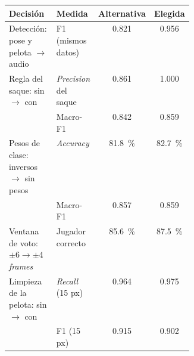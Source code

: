 \begin{tabular}{>{\raggedright\arraybackslash}p{0.36\linewidth}lcc}
\toprule
Decisión & Medida & Alternativa & Elegida \\
\midrule
Detección: pose y pelota $\to$ audio & F1 (mismos datos) & \num{0.821} & \num{0.956} \\
\midrule
Regla del saque: sin $\to$ con & \emph{Precision} del saque & \num{0.861} & \num{1.000} \\
 & Macro-F1 & \num{0.842} & \num{0.859} \\
\midrule
Pesos de clase: inversos $\to$ sin pesos & \emph{Accuracy} & \SI{81.8}{\percent} & \SI{82.7}{\percent} \\
 & Macro-F1 & \num{0.857} & \num{0.859} \\
\midrule
Ventana de voto: $\pm 6 \to \pm 4$ \emph{frames} & Jugador correcto & \SI{85.6}{\percent} & \SI{87.5}{\percent} \\
\midrule
Limpieza de la pelota: sin $\to$ con & \emph{Recall} (15 px) & \num{0.964} & \num{0.975} \\
 & F1 (15 px) & \num{0.915} & \num{0.902} \\
\bottomrule
\end{tabular}
